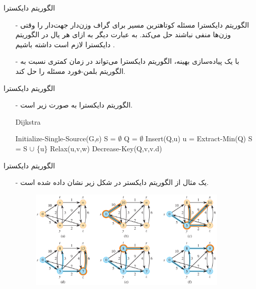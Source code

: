 
\begin{frame}{‌الگوریتم دایکسترا}
\begin{itemize}\itemr
\item[-]
الگوریتم دایکسترا مسئله کوتاهترین مسیر برای گراف وزن‌دار جهت‌دار
را وقتی وزن‌ها منفی نباشند حل می‌کند. به عبارت دیگر به ازای هر یال
در الگوریتم دایکسترا لازم است داشته باشیم
 .
\item[-]
با یک پیاده‌سازی بهینه، الگوریتم دایکسترا می‌تواند در زمان کمتری نسبت به الگوریتم بلمن-فورد مسئله را حل کند.
\end{itemize}
\end{frame}


\begin{frame}{‌الگوریتم دایکسترا}
\begin{itemize}\itemr
\item[-]
الگوریتم دایکسترا به صورت زیر است.
\begin{algorithm}[H]\alglr
  \caption{Dijkstra} 
  \begin{algorithmic}[1]
   \State Initialize-Single-Source(G,s)
   \State S = $\emptyset$
   \State Q = $\emptyset$
   		\State Insert(Q,u)
   	\EndFor
   			\State u = Extract-Min(Q)
   			\State S = S $\cup$ \{u\}
   					\State Relax(u,v,w)
   							\State Decrease-Key(Q,v,v.d)
   					\EndIf
   			\EndFor
   	\EndWhile                       
  \end{algorithmic}
  \label{alg:merge}
\end{algorithm}
\end{itemize}
\end{frame}


\begin{frame}{‌الگوریتم دایکسترا}
\begin{itemize}\itemr
\item[-]
یک مثال از الگوریتم دایکستر در شکل زیر نشان داده شده است.
\begin{figure}
\includegraphics[width=0.9\textwidth]{figs/chap07/621-dijkstra}
\end{figure}
\end{itemize}
\end{frame}


